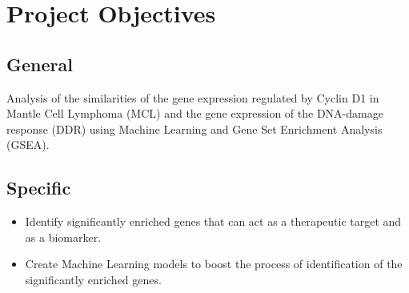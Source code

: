 \onehalfspacing

\section{Project Objectives}
\subsection{General}
Analysis of the similarities of the gene expression regulated by Cyclin D1 in Mantle Cell Lymphoma (MCL) and the gene expression of the DNA-damage response (DDR) using Machine Learning and Gene Set Enrichment Analysis (GSEA).

\subsection{Specific}

\begin{itemize}
    \item Identify significantly enriched genes that can act as a therapeutic target and as a biomarker.
    \item Create Machine Learning models to boost the process of identification of the significantly enriched genes.
\end{itemize}
